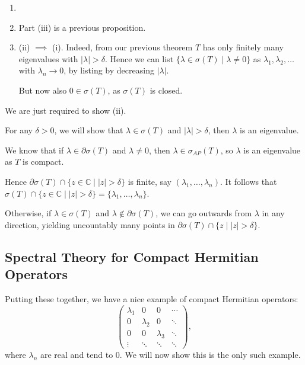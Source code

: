 \documentclass[12pt]{article}
\begin{document}
\begin{remark}
	\begin{enumerate}
		\item[]\
		\item Part (iii) is a previous proposition.
		\item (ii) $\implies$ (i). Indeed, from our previous theorem $T$ has only finitely many eigenvalues with $|\lambda| > \delta$. Hence we can list $\{\lambda \in \sigma(T) \mid \lambda \neq 0\}$ as $\lambda_1, \lambda_2, \ldots$ with $\lambda_n \to 0$, by listing by decreasing $|\lambda|$.

			But now also $0 \in \sigma(T)$, as $\sigma(T)$ is closed.
	\end{enumerate}
\end{remark}

\begin{proofbox}
	We are just required to show (ii).

	For any $\delta > 0$, we will show that $\lambda \in \sigma(T)$ and $|\lambda| > \delta$, then $\lambda$ is an eigenvalue.

	We know that if $\lambda \in \partial \sigma(T)$ and $\lambda \neq 0$, then $\lambda \in \sigma_{AP}(T)$, so $\lambda$ is an eigenvalue as $T$ is compact.

	Hence $\partial \sigma(T) \cap \{z \in \mathbb{C} \mid |z| > \delta\}$ is finite, say $(\lambda_1, \ldots, \lambda_n)$. It follows that $\sigma(T) \cap \{z \in \mathbb{C} \mid |z| > \delta\} = \{\lambda_1, \ldots, \lambda_n\}$.

	Otherwise, if $\lambda \in \sigma(T)$ and $\lambda \not \in \partial \sigma(T)$, we can go outwards from $\lambda$ in any direction, yielding uncountably many points in $\partial \sigma(T) \cap \{z \mid |z| > \delta\}$.
\end{proofbox}

\subsection{Spectral Theory for Compact Hermitian Operators}
\label{sub:spec_comp_herm}

Putting these together, we have a nice example of compact Hermitian operators:
\[
\begin{pmatrix}
	\lambda_1 & 0 & 0 & \cdots \\
	0 & \lambda_2 & 0 & \ddots \\
	0 & 0 & \lambda_3 & \ddots \\
	\vdots & \ddots & \ddots & \ddots
\end{pmatrix},
\]
where $\lambda_n$ are real and tend to 0. We will now show this is the only such example.
\end{document}
